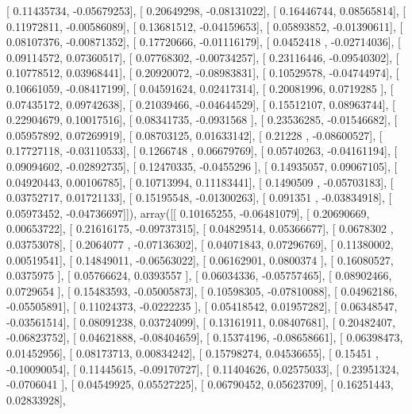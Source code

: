 \documentclass{article}
\begin{document}
       [ 0.11435734, -0.05679253],
       [ 0.20649298, -0.08131022],
       [ 0.16446744,  0.08565814],
       [ 0.11972811, -0.00586089],
       [ 0.13681512, -0.04159653],
       [ 0.05893852, -0.01390611],
       [ 0.08107376, -0.00871352],
       [ 0.17720666, -0.01116179],
       [ 0.0452418 , -0.02714036],
       [ 0.09114572,  0.07360517],
       [ 0.07768302, -0.00734257],
       [ 0.23116446, -0.09540302],
       [ 0.10778512,  0.03968441],
       [ 0.20920072, -0.08983831],
       [ 0.10529578, -0.04744974],
       [ 0.10661059, -0.08417199],
       [ 0.04591624,  0.02417314],
       [ 0.20081996,  0.0719285 ],
       [ 0.07435172,  0.09742638],
       [ 0.21039466, -0.04644529],
       [ 0.15512107,  0.08963744],
       [ 0.22904679,  0.10017516],
       [ 0.08341735, -0.0931568 ],
       [ 0.23536285, -0.01546682],
       [ 0.05957892,  0.07269919],
       [ 0.08703125,  0.01633142],
       [ 0.21228   , -0.08600527],
       [ 0.17727118, -0.03110533],
       [ 0.1266748 ,  0.06679769],
       [ 0.05740263, -0.04161194],
       [ 0.09094602, -0.02892735],
       [ 0.12470335, -0.0455296 ],
       [ 0.14935057,  0.09067105],
       [ 0.04920443,  0.00106785],
       [ 0.10713994,  0.11183441],
       [ 0.1490509 , -0.05703183],
       [ 0.03752717,  0.01721133],
       [ 0.15195548, -0.01300263],
       [ 0.091351  , -0.03834918],
       [ 0.05973452, -0.04736697]]), array([[ 0.10165255, -0.06481079],
       [ 0.20690669,  0.00653722],
       [ 0.21616175, -0.09737315],
       [ 0.04829514,  0.05366677],
       [ 0.0678302 ,  0.03753078],
       [ 0.2064077 , -0.07136302],
       [ 0.04071843,  0.07296769],
       [ 0.11380002,  0.00519541],
       [ 0.14849011, -0.06563022],
       [ 0.06162901,  0.0800374 ],
       [ 0.16080527,  0.0375975 ],
       [ 0.05766624,  0.0393557 ],
       [ 0.06034336, -0.05757465],
       [ 0.08902466,  0.0729654 ],
       [ 0.15483593, -0.05005873],
       [ 0.10598305, -0.07810088],
       [ 0.04962186, -0.05505891],
       [ 0.11024373, -0.0222235 ],
       [ 0.05418542,  0.01957282],
       [ 0.06348547, -0.03561514],
       [ 0.08091238,  0.03724099],
       [ 0.13161911,  0.08407681],
       [ 0.20482407, -0.06823752],
       [ 0.04621888, -0.08404659],
       [ 0.15374196, -0.08658661],
       [ 0.06398473,  0.01452956],
       [ 0.08173713,  0.00834242],
       [ 0.15798274,  0.04536655],
       [ 0.15451   , -0.10090054],
       [ 0.11445615, -0.09170727],
       [ 0.11404626,  0.02575033],
       [ 0.23951324, -0.0706041 ],
       [ 0.04549925,  0.05527225],
       [ 0.06790452,  0.05623709],
       [ 0.16251443,  0.02833928],
\end{document}
